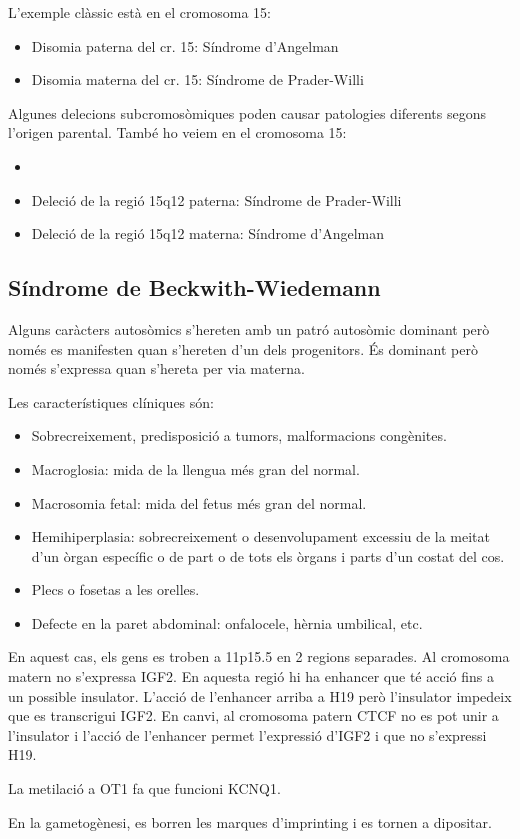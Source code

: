 L'exemple clàssic està en el cromosoma 15:
\begin{itemize}
\item Disomia paterna del cr. 15: Síndrome d'Angelman
\item Disomia materna del cr. 15: Síndrome de Prader-Willi
\end{itemize}

Algunes delecions subcromosòmiques poden causar patologies diferents segons l'origen parental. També ho veiem en el cromosoma 15:
\begin{itemize}
\item \item Deleció de la regió 15q12 paterna: Síndrome de Prader-Willi
\item Deleció de la regió 15q12 materna: Síndrome d'Angelman 
\end{itemize}

\subsection{Síndrome de Beckwith-Wiedemann}
\label{sec:sindrome-de-beckwith}

Alguns caràcters autosòmics s'hereten amb un patró autosòmic dominant però només es manifesten quan s'hereten d'un dels progenitors. És dominant però només s'expressa quan s'hereta per via materna.

Les característiques clíniques són:
\begin{itemize}
\item Sobrecreixement, predisposició a tumors,
malformacions congènites.

\item Macroglosia: mida de la llengua més gran del normal. 

\item Macrosomia fetal: mida del fetus més gran del normal.

\item Hemihiperplasia: sobrecreixement o desenvolupament excessiu de la meitat d'un òrgan específic o de part o de tots els òrgans i parts d'un costat del cos.

\item Plecs o fosetas a les orelles.
\item Defecte en la paret abdominal: onfalocele, hèrnia umbilical, etc.
\end{itemize}

En aquest cas, els gens es troben a 11p15.5 en 2 regions separades. Al cromosoma matern no s'expressa IGF2. En aquesta regió hi ha enhancer que té acció fins a un possible insulator. L'acció de l'enhancer arriba a H19 però l'insulator impedeix que es transcrigui IGF2. En canvi, al cromosoma patern CTCF no es pot unir a l'insulator i l'acció de l'enhancer permet l'expressió d'IGF2 i que no s'expressi H19.

La metilació a OT1 fa que funcioni KCNQ1.


En la gametogènesi, es borren les marques d'imprinting i es tornen a dipositar.